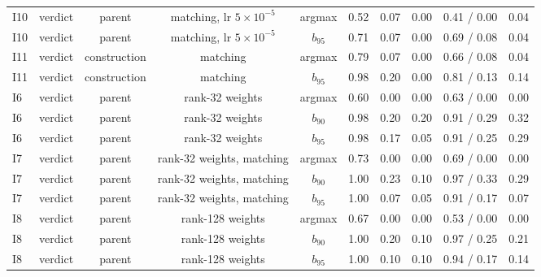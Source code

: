 \begin{tabular}{@{}lccccccccc@{}}
I10 & verdict & parent & matching, lr $5{\times}10^{-5}$ & argmax & 0.52 & 0.07 & 0.00 & 0.41 / 0.00 & 0.04 \\
I10 & verdict & parent & matching, lr $5{\times}10^{-5}$ & $b_{95}$ & 0.71 & 0.07 & 0.00 & 0.69 / 0.08 & 0.04 \\
I11 & verdict & construction & matching & argmax & 0.79 & 0.07 & 0.00 & 0.66 / 0.08 & 0.04 \\
I11 & verdict & construction & matching & $b_{95}$ & 0.98 & 0.20 & 0.00 & 0.81 / 0.13 & 0.14 \\
\addlinespace[2pt]
I6 & verdict & parent & rank-32 weights & argmax & 0.60 & 0.00 & 0.00 & 0.63 / 0.00 & 0.00 \\
I6 & verdict & parent & rank-32 weights & $b_{90}$ & 0.98 & 0.20 & 0.20 & 0.91 / 0.29 & 0.32 \\
I6 & verdict & parent & rank-32 weights & $b_{95}$ & 0.98 & 0.17 & 0.05 & 0.91 / 0.25 & 0.29 \\
I7 & verdict & parent & rank-32 weights, matching & argmax & 0.73 & 0.00 & 0.00 & 0.69 / 0.00 & 0.00 \\
I7 & verdict & parent & rank-32 weights, matching & $b_{90}$ & 1.00 & 0.23 & 0.10 & 0.97 / 0.33 & 0.29 \\
I7 & verdict & parent & rank-32 weights, matching & $b_{95}$ & 1.00 & 0.07 & 0.05 & 0.91 / 0.17 & 0.07 \\
I8 & verdict & parent & rank-128 weights & argmax & 0.67 & 0.00 & 0.00 & 0.53 / 0.00 & 0.00 \\
I8 & verdict & parent & rank-128 weights & $b_{90}$ & 1.00 & 0.20 & 0.10 & 0.97 / 0.25 & 0.21 \\
I8 & verdict & parent & rank-128 weights & $b_{95}$ & 1.00 & 0.10 & 0.10 & 0.94 / 0.17 & 0.14 \\
\bottomrule
\end{tabular}
